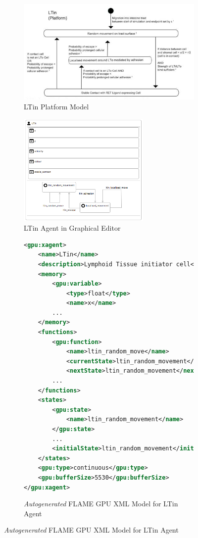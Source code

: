 \documentclass{UoYCSproject}
\begin{document}
\begin{figure}[htp]
\centering

\begin{subfigure}{0.49\textwidth}
\centering
\includegraphics[width=\textwidth]{Appendix/Models/LTin_Cropped}
\caption{LTin Platform Model \cite{kieran_thesis}}
\label{fig:ltin_cropped}
\end{subfigure}
\begin{subfigure}{0.49\textwidth}
\centering
\includegraphics[width=0.7\textwidth]{Appendix/Models/LTin_GMF}
\caption{LTin Agent in Graphical Editor}
\label{fig:ltin_gmf}
\end{subfigure}

\begin{subfigure}{0.75\textwidth}
\centering
\begin{lstlisting}[language=XML, basicstyle=\tiny]
<gpu:xagent>
    <name>LTin</name>
    <description>Lymphoid Tissue initiator cell</description>
    <memory>
        <gpu:variable>
            <type>float</type>
            <name>x</name>
        ...
    </memory>
    <functions>
        <gpu:function>
            <name>ltin_random_move</name>
            <currentState>ltin_random_movement</currentState>
            <nextState>ltin_random_movement</nextState>
        ...
    </functions>
    <states>
        <gpu:state>
            <name>ltin_random_movement</name>
        </gpu:state>
        ...
        <initialState>ltin_random_movement</initialState>
    </states>
    <gpu:type>continuous</gpu:type>
    <gpu:bufferSize>5530</gpu:bufferSize>
</gpu:xagent>
\end{lstlisting}
\caption{\textit{Autogenerated} \gls{FLAME GPU} XML Model for LTin Agent}
\label{fig:xml_ltin}
\end{subfigure}


\end{figure}
\end{document}
